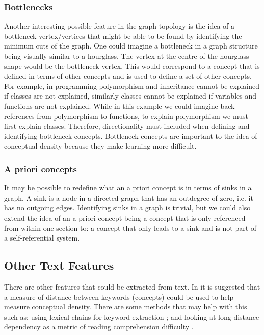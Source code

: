 \documentclass[12pt]{article}
\begin{document}
\subsubsection{Bottlenecks} \label{sec:bottlenecks}
Another interesting possible feature in the graph topology is the idea of a bottleneck vertex/vertices that might be able to be found by identifying the minimum cuts of the graph. One could imagine a bottleneck in a graph structure being visually similar to a hourglass.
The vertex at the centre of the hourglass shape would be the bottleneck vertex. This would correspond to a concept that is defined in terms of other concepts and is used to define a set of other concepts. For example, in programming polymorphism and inheritance cannot be explained if classes are not explained, similarly classes cannot be explained if variables and functions are not explained. While in this example we could imagine back references from polymorphism to functions, to explain polymorphism we must first explain classes. Therefore, directionality must included when defining and identifying bottleneck concepts. Bottleneck concepts are important to the idea of conceptual density because they make learning more difficult.

\subsubsection{A priori concepts}
It may be possible to redefine what an a priori concept is in terms of sinks in a graph. A sink is a node in a directed graph that has an outdegree of zero, i.e. it has no outgoing edges. Identifying sinks in a graph is trivial, but we could also extend the idea of an a priori concept being a concept that is only referenced from within one section to: a concept that only leads to a sink and is not part of a self-referential system. 

\subsection{Other Text Features}
There are other features that could be extracted from text.
In \citep{robins2010learning} it is suggested that a measure of distance between keywords (concepts) could be used to help measure conceptual density. There are some methods that may help with this such as: using lexical chains for keyword extraction \citep{ercan2007using}; and looking at long distance dependency as a metric of reading comprehension difficulty \citep{liu2008dependency}. 
\end{document}
